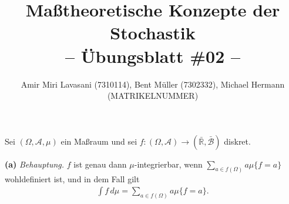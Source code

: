 \documentclass[10pt]{article}
\newcommand{\R}{\mathbb{R}}
\newcommand{\beh}{\textit{Behauptung. }}
\newenvironment{Aufgabe}[2][Aufgabe]{\begin{trivlist}
\item[\hskip \labelsep {\bfseries #1}\hskip \labelsep {\bfseries #2.}]}{\end{trivlist}}
\begin{document}
 
\title{ \textbf{Maßtheoretische Konzepte der Stochastik \\ -- Übungsblatt \#02 --} }

\author{Amir Miri Lavasani (7310114), Bent Müller (7302332),
        Michael Hermann (MATRIKELNUMMER)} \maketitle

 
\begin{Aufgabe}{2}
    Sei $(\Omega,\mathcal{A},\mu)$ ein Maßraum und sei $f: (\Omega,\mathcal{A})\to (\bar{\R} , \bar{\mathcal{B}})$
    diskret. 
\end{Aufgabe}

\textbf{(a)} \beh $f$ ist genau dann $\mu$-integrierbar, wenn $\sum_{a\in f(\Omega)} a\mu\{f=a\}$ 
wohldefiniert ist, und in dem Fall gilt 
  \begin{align*}
    \int f \,d\mu = \sum_{a\in f(\Omega)} a\mu\{f=a\}.
  \end{align*}
\end{document}
